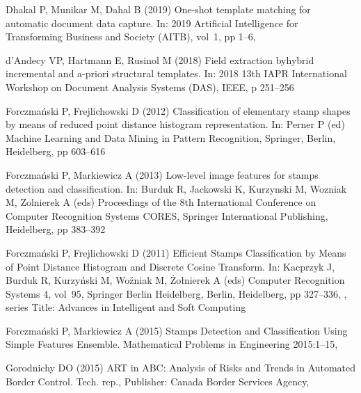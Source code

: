 \documentclass[twocolumn]{svjour3}
\begin{document}
\begin{thebibliography}{43}
	Dhakal P, Munikar M, Dahal B (2019) One-shot template matching for automatic
	document data capture. In: 2019 Artificial Intelligence for Transforming
	Business and Society (AITB), vol~1, pp 1--6,
	
	{d’Andecy} VP, Hartmann E, Rusinol M (2018) Field extraction byhybrid
	incremental and a-priori structural templates. In: 2018 13th IAPR
	International Workshop on Document Analysis Systems (DAS), IEEE, p 251–256
	
	Forczma{\'{n}}ski P, Frejlichowski D (2012) Classification of elementary stamp
	shapes by means of reduced point distance histogram representation. In:
	Perner P (ed) Machine Learning and Data Mining in Pattern Recognition,
	Springer, Berlin, Heidelberg, pp 603--616
	
	Forczma{\'{n}}ski P, Markiewicz A (2013) Low-level image features for stamps
	detection and classification. In: Burduk R, Jackowski K, Kurzynski M, Wozniak
	M, Zolnierek A (eds) Proceedings of the 8th International Conference on
	Computer Recognition Systems CORES, Springer International Publishing,
	Heidelberg, pp 383--392
	
	Forczmański P, Frejlichowski D (2011) Efficient {Stamps} {Classification} by
	{Means} of {Point} {Distance} {Histogram} and {Discrete} {Cosine}
	{Transform}. In: Kacprzyk J, Burduk R, Kurzyński M, Woźniak M, Żołnierek
	A (eds) Computer {Recognition} {Systems} 4, vol~95, Springer Berlin
	Heidelberg, Berlin, Heidelberg, pp 327--336,
	, series Title: Advances
	in Intelligent and Soft Computing
	
	Forczmański P, Markiewicz A (2015) Stamps {Detection} and {Classification}
	{Using} {Simple} {Features} {Ensemble}. Mathematical Problems in Engineering
	2015:1--15, 
	
	Gorodnichy DO (2015) {ART} in {ABC}: {Analysis} of {Risks} and {Trends} in
	{Automated} {Border} {Control}. Tech. rep., Publisher: Canada Border Services
	Agency, 
	

\end{thebibliography}
\end{document}
